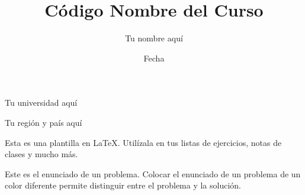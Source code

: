 \title{C\'odigo Nombre del Curso}
\author{Tu nombre aqu\'i}
\date{Fecha}



\maketitle

\vspace*{-0.25in}
\centerline{Tu universidad aqu\'i}
\centerline{Tu regi\'on y pa\'is aqu\'i}
\centerline{}
\vspace*{0.15in}

\begin{framed}
  Esta es una plantilla en \LaTeX.
  Util\'izala en tus listas de ejercicios, notas de clases y mucho m\'as.
\end{framed}

\begin{statement}{1}
    Este es el enunciado de un problema.
    Colocar el enunciado de un problema de un color diferente permite distinguir entre el problema y la soluci\'on.
\end{statement}

